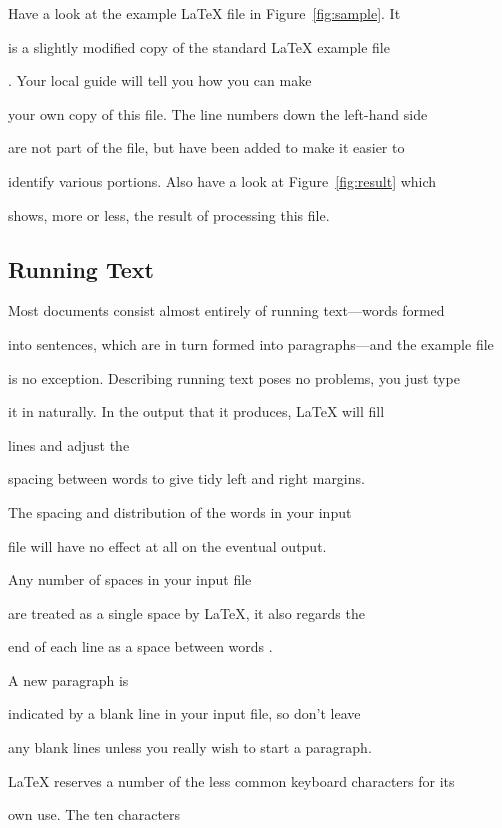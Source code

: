 Have a look at the example \LaTeX{} file in Figure~\ref{fig:sample}.  It

is a slightly modified copy of the standard \LaTeX{} example file

.  Your local guide will tell you how you can make

your own copy of this file.  The line numbers down the left-hand side

are not part of the file, but have been added to make it easier to

identify various portions. Also have a look at Figure~\ref{fig:result} which

shows, more or less, the result of processing this file.



\subsection{Running Text}



Most documents consist almost entirely of running text---words formed

into sentences, which are in turn formed into paragraphs---and the example file

is no exception. Describing running text poses no problems, you just type

it in naturally. In the output that it produces, \LaTeX{} will fill

lines and adjust the

spacing between words to give tidy left and right margins.

The spacing and distribution of the words in your input

file will have no effect at all on the eventual output.

Any number of spaces in your input file

are treated as a single space by \LaTeX{}, it also regards the

end of each line as a space between words .

A new paragraph is

indicated by a blank line in your input file, so don't leave

any blank lines unless you really wish to start a paragraph.



\LaTeX{} reserves a number of the less common keyboard characters for its

own use. The ten characters

